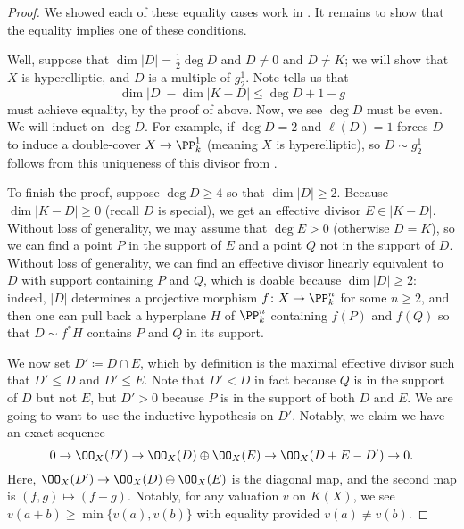 \documentclass[../notes.tex]{subfiles}
\begin{document}
\begin{proof}
	We showed each of these equality cases work in . It remains to show that the equality implies one of these conditions.

	Well, suppose that $\dim|D|=\frac12\deg D$ and $D\ne0$ and $D\ne K$; we will show that $X$ is hyperelliptic, and $D$ is a multiple of $g^1_2$. Note  tells us that
	\[\dim|D|-\dim|K-D|\le\deg D+1-g\]
	must achieve equality, by the proof of  above. Now, we see $\deg D$ must be even. We will induct on $\deg D$. For example, if $\deg D=2$ and $\ell(D)=1$ forces $D$ to induce a double-cover $X\to\PP^1_k$ (meaning $X$ is hyperelliptic), so $D\sim g^1_2$ follows from this uniqueness of this divisor from .

	To finish the proof, suppose $\deg D\ge4$ so that $\dim|D|\ge2$. Because $\dim|K-D|\ge0$ (recall $D$ is special), we get an effective divisor $E\in|K-D|$. Without loss of generality, we may assume that $\deg E>0$ (otherwise $D=K$), so we can find a point $P$ in the support of $E$ and a point $Q$ not in the support of $D$. Without loss of generality, we can find an effective divisor linearly equivalent to $D$ with support containing $P$ and $Q$, which is doable because $\dim|D|\ge2$: indeed, $|D|$ determines a projective morphism $f\colon X\to\PP^n_k$ for some $n\ge2$, and then one can pull back a hyperplane $H$ of $\PP^n_k$ containing $f(P)$ and $f(Q)$ so that $D\sim f^*H$ contains $P$ and $Q$ in its support.

	We now set $D'\coloneqq D\cap E$, which by definition is the maximal effective divisor such that $D'\le D$ and $D'\le E$. Note that $D'<D$ in fact because $Q$ is in the support of $D$ but not $E$, but $D'>0$ because $P$ is in the support of both $D$ and $E$. We are going to want to use the inductive hypothesis on $D'$. Notably, we claim we have an exact sequence
	\[0\to\OO_X(D')\to\OO_X(D)\oplus\OO_X(E)\to\OO_X(D+E-D')\to0.\]
	Here, $\OO_X(D')\to\OO_X(D)\oplus\OO_X(E)$ is the diagonal map, and the second map is $(f,g)\mapsto(f-g)$. Notably, for any valuation $v$ on $K(X)$, we see $v(a+b)\ge\min\{v(a),v(b)\}$ with equality provided $v(a)\ne v(b)$.


\end{proof}
\end{document}
